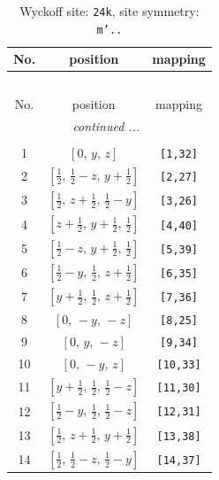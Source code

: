 \documentclass[fleqn,8pt]{jsarticle}
\begin{document}
\begin{longtable}{ccc}
\caption{Wyckoff site: {\tt 24k}, site symmetry: {\tt m'..}}
 \\
 \hline \hline
No. & position & mapping \\ \hline \endfirsthead

\multicolumn{2}{l}{\tablename\ \thetable{}} \\
 \hline \hline
No. & position & mapping \\ \hline \endhead

 \hline \hline
\multicolumn{2}{r}{\footnotesize\it continued ...} \\ \endfoot

 \hline \hline
\multicolumn{2}{r}{} \\ \endlastfoot

1 & $\left[ 0,\, y,\, z \right]$ & {\tt [1,32]} \\ \hline
2 & $\left[ \frac{1}{2},\, \frac{1}{2} - z,\, y + \frac{1}{2} \right]$ & {\tt [2,27]} \\ \hline
3 & $\left[ \frac{1}{2},\, z + \frac{1}{2},\, \frac{1}{2} - y \right]$ & {\tt [3,26]} \\ \hline
4 & $\left[ z + \frac{1}{2},\, y + \frac{1}{2},\, \frac{1}{2} \right]$ & {\tt [4,40]} \\ \hline
5 & $\left[ \frac{1}{2} - z,\, y + \frac{1}{2},\, \frac{1}{2} \right]$ & {\tt [5,39]} \\ \hline
6 & $\left[ \frac{1}{2} - y,\, \frac{1}{2},\, z + \frac{1}{2} \right]$ & {\tt [6,35]} \\ \hline
7 & $\left[ y + \frac{1}{2},\, \frac{1}{2},\, z + \frac{1}{2} \right]$ & {\tt [7,36]} \\ \hline
8 & $\left[ 0,\, - y,\, - z \right]$ & {\tt [8,25]} \\ \hline
9 & $\left[ 0,\, y,\, - z \right]$ & {\tt [9,34]} \\ \hline
10 & $\left[ 0,\, - y,\, z \right]$ & {\tt [10,33]} \\ \hline
11 & $\left[ y + \frac{1}{2},\, \frac{1}{2},\, \frac{1}{2} - z \right]$ & {\tt [11,30]} \\ \hline
12 & $\left[ \frac{1}{2} - y,\, \frac{1}{2},\, \frac{1}{2} - z \right]$ & {\tt [12,31]} \\ \hline
13 & $\left[ \frac{1}{2},\, z + \frac{1}{2},\, y + \frac{1}{2} \right]$ & {\tt [13,38]} \\ \hline
14 & $\left[ \frac{1}{2},\, \frac{1}{2} - z,\, \frac{1}{2} - y \right]$ & {\tt [14,37]} \\ \hline

\end{longtable}
\end{document}
